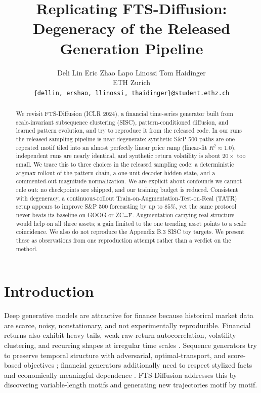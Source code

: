 \documentclass{article}
\title{Replicating FTS-Diffusion: Degeneracy of the Released Generation Pipeline}
\author{%
  Deli Lin \quad Eric Zhao \quad Lapo Linossi \quad Tom Haidinger \\
  ETH Zurich \\
  \texttt{\{dellin, ershao, llinossi, thaidinger\}@student.ethz.ch}
}
\begin{document}
\maketitle

\begin{abstract}
We revisit FTS-Diffusion (ICLR 2024), a financial time-series generator built from scale-invariant subsequence clustering (SISC), pattern-conditioned diffusion, and learned pattern evolution, and try to reproduce it from the released code. In our runs the released sampling pipeline is near-degenerate: synthetic S\&P 500 paths are one repeated motif tiled into an almost perfectly linear price ramp (linear-fit $R^2 \approx 1.0$), independent runs are nearly identical, and synthetic return volatility is about $20\times$ too small. We trace this to three choices in the released sampling code: a deterministic argmax rollout of the pattern chain, a one-unit decoder hidden state, and a commented-out magnitude normalization. We are explicit about confounds we cannot rule out: no checkpoints are shipped, and our training budget is reduced. Consistent with degeneracy, a continuous-rollout Train-on-Augmentation-Test-on-Real (TATR) setup appears to improve S\&P 500 forecasting by up to $85\%$, yet the same protocol never beats its baseline on GOOG or ZC=F. Augmentation carrying real structure would help on all three assets; a gain limited to the one trending asset points to a scale coincidence. We also do not reproduce the Appendix B.3 SISC toy targets. We present these as observations from one reproduction attempt rather than a verdict on the method.
\end{abstract}

\section{Introduction}

Deep generative models are attractive for finance because historical market data are scarce, noisy, nonstationary, and not experimentally reproducible. Financial returns also exhibit heavy tails, weak raw-return autocorrelation, volatility clustering, and recurring shapes at irregular time scales \citep{cont2001stylized}. Sequence generators try to preserve temporal structure with adversarial, optimal-transport, and score-based objectives \citep{yoon2019timegan,xu2020cotgan,tashiro2021csdi}; financial generators additionally need to respect stylized facts and economically meaningful dependence \citep{wiese2020quant}. FTS-Diffusion \citep{huang2024fts} addresses this by discovering variable-length motifs and generating new trajectories motif by motif.
\end{document}
